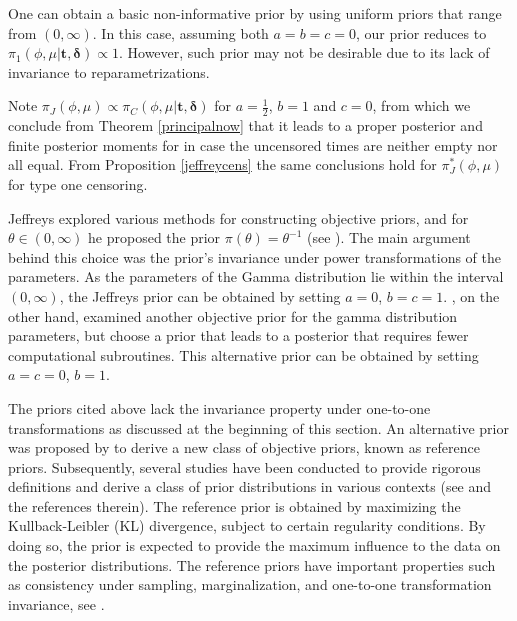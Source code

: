 One can obtain a basic non-informative prior by using uniform priors that range from $(0,\infty)$. In this case, assuming both $a=b=c=0$, our prior reduces to $\pi_1(\phi,\mu|\boldsymbol{t,\delta})\propto 1$. However, such prior may not be  desirable due to its lack of invariance to reparametrizations.

Note $\pi_J\left(\phi,\mu\right) \propto \pi_C(\phi,\mu|\boldsymbol{t,\delta})$ for $a=\frac{1}{2}$, $b=1$ and $c=0$, from which we conclude from Theorem \ref{principalnow} that it leads to a proper posterior and finite posterior moments for in case the uncensored times are neither empty nor all equal. From Proposition \ref{jeffreycens} the same conclusions hold for $\pi_J^*\left(\phi,\mu\right)$ for type one censoring.


Jeffreys explored various methods for constructing objective priors, and for $\theta\in(0,\infty)$ he proposed the prior $\pi(\theta)=\theta^{-1}$ (see  \cite{kass1996selection}). The main argument behind this choice was the prior's invariance under power transformations of the parameters. As the parameters of the Gamma distribution lie within the interval $(0,\infty)$, the Jeffreys prior can be obtained by setting $a=0$, $b=c=1$.  \cite{miller1980bayesian}, on the other hand, examined another objective prior for the gamma distribution parameters, but choose a prior that leads to a posterior that requires fewer computational subroutines. This alternative prior can be obtained by setting $a=c=0$, $b=1$.

The priors cited above lack the invariance property under one-to-one transformations as discussed at the beginning of this section. An alternative prior was proposed by  \cite{bernardo1979a}  to derive a new class of objective priors, known as reference priors. Subsequently, several studies have been conducted to provide rigorous definitions and derive a class of prior distributions in various contexts (see \cite{berger2015} and the references therein). The reference prior is obtained by maximizing the Kullback-Leibler (KL) divergence, subject to certain regularity conditions. By doing so, the prior is expected to provide the maximum influence to the data on the posterior distributions. The reference priors have important properties such as consistency under sampling, marginalization, and one-to-one transformation invariance, see \cite{bernardo2005}. 

